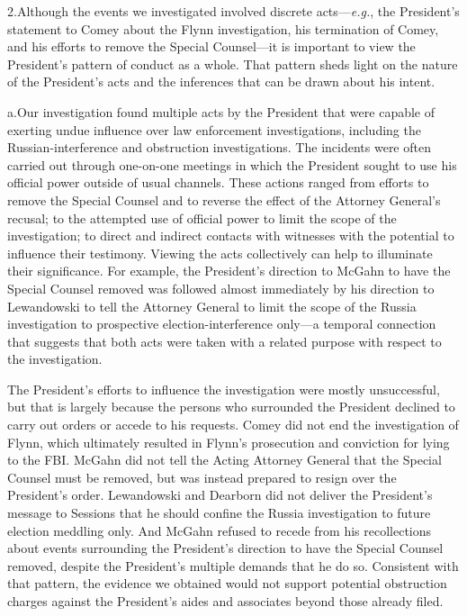 2.\quad Although the events we investigated involved discrete acts---\textit{e.g.}, the President's statement to Comey about the Flynn investigation, his termination of Comey, and his efforts to remove the Special Counsel---it is important to view the President's pattern of conduct as a whole.
That pattern sheds light on the nature of the President's acts and the inferences that can be drawn about his intent.

a.\quad Our investigation found multiple acts by the President that were capable of exerting undue influence over law enforcement investigations, including the Russian-interference and obstruction investigations.
The incidents were often carried out through one-on-one meetings in which the President sought to use his official power outside of usual channels.
These actions ranged from efforts to remove the Special Counsel and to reverse the effect of the Attorney General's recusal; to the attempted use of official power to limit the scope of the investigation; to direct and indirect contacts with witnesses with the potential to influence their testimony.
Viewing the acts collectively can help to illuminate their significance.
For example, the President's direction to McGahn to have the Special Counsel removed was followed almost immediately by his direction to Lewandowski to tell the Attorney General to limit the scope of the Russia investigation to prospective election-interference only---a temporal connection that suggests that both acts were taken with a related purpose with respect to the investigation.

The President's efforts to influence the investigation were mostly unsuccessful, but that is largely because the persons who surrounded the President declined to carry out orders or accede to his requests.
Comey did not end the investigation of Flynn, which ultimately resulted in Flynn's prosecution and conviction for lying to the FBI\null.
McGahn did not tell the Acting Attorney General that the Special Counsel must be removed, but was instead prepared to resign over the President's order.
Lewandowski and Dearborn did not deliver the President's message to Sessions that he should confine the Russia investigation to future election meddling only.
And McGahn refused to recede from his recollections about events surrounding the President's direction to have the Special Counsel removed, despite the President's multiple demands that he do so.
Consistent with that pattern, the evidence we obtained would not support potential obstruction charges against the President's aides and associates beyond those already filed.

